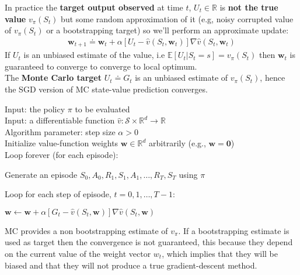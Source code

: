 In practice the \textbf{target output observed} at time $t$, $U_t\in\mathbb{R}$ is \textbf{not the true value} $v_\pi(S_t)$ but some random approximation of it (e.g, noisy corrupted value of $v_\pi(S_t)$ or a bootstrapping target) so we'll perform an approximate update:
\begin{align}
    \mathbf{w}_{t+1}\doteq\mathbf{w}_{t}+\alpha[U_t-\hat{v}(S_t, \mathbf{w}_{t})]\nabla \hat{v}(S_t, \mathbf{w}_{t})
\end{align}
If $U_t$ is an unbiased estimate of the value, i.e $\mathbb{E}[U_t|S_t=s]=v_\pi(S_t)$ then $\mathbf{w}_t$ is guaranteed to converge to converge to local optimum.\\

The \textbf{Monte Carlo target} $U_t\doteq G_t$ is an unbiased estimate of $v_\pi(S_t)$, hence the SGD version of MC state-value prediction converges.\\

\begin{tcolorbox}[colback=black!7!white,colframe=black!75!white,title=\textbf{Gradient Monte Carlo Algorithm for Estimating} $\mathbf{\hat{v}\approx v_\pi}$]
Input: the policy $\pi$ to be evaluated\\
Input: a differentiable function $\hat{v}: \mathcal{S}\times\mathbb{R}^d\rightarrow\mathbb{R}$\\
Algorithm parameter: step size $\alpha > 0$\\
Initialize value-function weights $\mathbf{w}\in\mathbb{R}^d$ arbitrarily (e.g., $\mathbf{w=0}$)\\

Loop forever (for each episode):

    \qquad Generate an episode $S_0, A_0, R_1, S_1, A_1,\dots,R_T,S_T$ using $\pi$

    \qquad Loop for each step of episode, $t=0,1,\dots, T-1$:

    \qquad\qquad $\mathbf{w}\leftarrow\mathbf{w}+\alpha[G_t-\hat{v}(S_t, \mathbf{w})]\nabla \hat{v}(S_t, \mathbf{w})$
\end{tcolorbox}

MC provides a non bootstrapping estimate of $v_\pi$. If a bootstrapping estimate is used as target then the convergence is not guaranteed, this because they depend on the current value of the
weight vector $w_t$, which implies that they will be biased and that they will not produce a true gradient-descent method.\\

